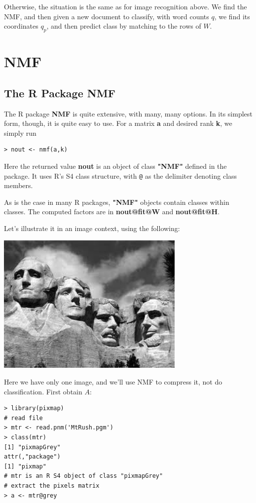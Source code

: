 Otherwise, the situation is the same as for image recognition above.  We
find the NMF, and then given a new document to classify, with word
counts $q$, we find its coordinates $q_p$, and then predict class by
matching to the rows of $W$.

\section{NMF}

\subsection{The R Package NMF}

The R package {\bf NMF} is quite extensive, with many, many options.  In
its simplest form, though, it is quite easy to use.  For a matrix {\bf
a} and desired rank {\bf k}, we simply run

\begin{lstlisting}
> nout <- nmf(a,k)
\end{lstlisting}

Here the returned value {\bf nout} is an object of class {\bf "NMF"}
defined in the package.  It uses R's S4 class structure, with
\lstinline{@} as the delimiter denoting class members.  

As is the case in many R packages, {\bf "NMF"} objects contain classes
within classes.  The computed factors are in {\bf nout@fit@W} and {\bf
nout@fit@H}.

Let's illustrate it in an image context, using the following:

\includegraphics[width=3.6in]{Images/MtRush.png}

Here we have only one image, and we'll use NMF to compress it, not do
classification.  First obtain $A$:

\begin{lstlisting}
> library(pixmap) 
# read file
> mtr <- read.pnm('MtRush.pgm') 
> class(mtr)
[1] "pixmapGrey"
attr(,"package")
[1] "pixmap"
# mtr is an R S4 object of class "pixmapGrey"
# extract the pixels matrix
> a <- mtr@grey
\end{lstlisting}


